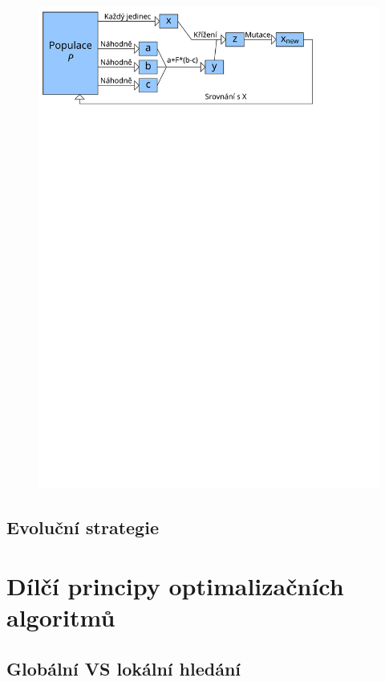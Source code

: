 \begin{figure}[h!]\label{DE fig}
  \includegraphics[width=\textwidth]{img/DE}
\end{figure}

\subsection{Evoluční strategie}

\section{Dílčí principy optimalizačních algoritmů}

\subsection{Globální VS lokální hledání}

